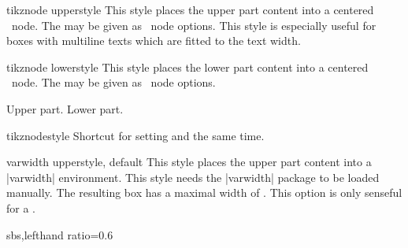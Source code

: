 \clearpage
\begin{docTcbKey}{tikznode upper}{}{style}
  This style places the upper part content into a centered
  \tikzname\  node. The  may be given as \tikzname\  node options.
  This style is especially useful for boxes with multiline texts which are
  fitted to the text width.
\end{docTcbKey}

\begin{docTcbKey}{tikznode lower}{}{style}
  This style places the lower part content into a centered
  \tikzname\ node. The  may be given as \tikzname\  node options.
\begin{dispExample}
\begin{tcolorbox}[bicolor,colback=LightBlue!50!white,colbacklower=white,
  colframe=black,tikznode lower={inner sep=2pt,draw=red,fill=yellow}]
Upper part.
\tcblower
Lower part.
\end{tcolorbox}
\end{dispExample}
\end{docTcbKey}

\begin{docTcbKey}{tikznode}{}{style}
  Shortcut for setting  and 
  the same time.
\end{docTcbKey}


\begin{docTcbKey}{varwidth upper}{}{style, default }
  This style places the upper part content into a |varwidth| environment.
  This style needs the |varwidth| package \cite{arseneau:2011a} to be loaded manually.
  The resulting box has a maximal width of .
  This option is only senseful for a .
\begin{dispExample*}{sbs,lefthand ratio=0.6}

\end{dispExample*}
\end{docTcbKey}


